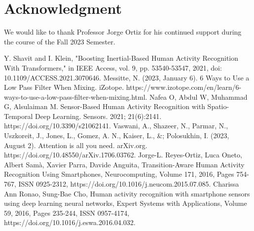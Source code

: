 \documentclass[conference]{IEEEtran}
\begin{document}
\section*{Acknowledgment}
We would like to thank Professor Jorge Ortiz for his continued support during the course of the Fall 2023 Semester. 

\begin{thebibliography}{00}
 Y. Shavit and I. Klein, "Boosting Inertial-Based Human Activity Recognition With Transformers," in IEEE Access, vol. 9, pp. 53540-53547, 2021, doi: 10.1109/ACCESS.2021.3070646.
 Messitte, N. (2023, January 6). 6 Ways to Use a Low Pass Filter When Mixing. iZotope. https://www.izotope.com/en/learn/6-ways-to-use-a-low-pass-filter-when-mixing.html.
 Nafea O, Abdul W, Muhammad G, Alsulaiman M. Sensor-Based Human Activity Recognition with Spatio-Temporal Deep Learning. Sensors. 2021; 21(6):2141. https://doi.org/10.3390/s21062141.
 Vaswani, A., Shazeer, N., Parmar, N., Uszkoreit, J., Jones, L., Gomez, A. N., Kaiser, L., \&; Polosukhin, I. (2023, August 2). Attention is all you need. arXiv.org. https://doi.org/10.48550/arXiv.1706.03762.
 Jorge-L. Reyes-Ortiz, Luca Oneto, Albert Samà, Xavier Parra, Davide Anguita, Transition-Aware Human Activity Recognition Using Smartphones, Neurocomputing, Volume 171, 2016, Pages 754-767, ISSN 0925-2312, https://doi.org/10.1016/j.neucom.2015.07.085.
 Charissa Ann Ronao, Sung-Bae Cho,
Human activity recognition with smartphone sensors using deep learning neural networks, Expert Systems with Applications, Volume 59, 2016, Pages 235-244, ISSN 0957-4174, https://doi.org/10.1016/j.eswa.2016.04.032.
\end{thebibliography}
\vspace{12pt}
\end{document}
